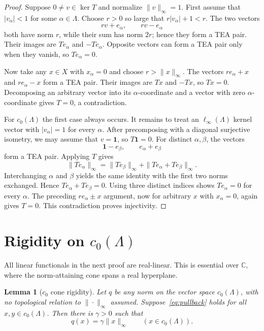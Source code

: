 \documentclass[11pt]{article}
\newtheorem{lemma}[theorem]{Lemma}
\begin{document}
\begin{proof}
Suppose $0\ne v\in\ker T$ and normalize $\|v\|_\infty=1$.  First assume
that $|v_\alpha|<1$ for some $\alpha\in\Lambda$.  Choose $r>0$ so large that
$r|v_\alpha|+1<r$.  The two vectors
\[
 rv+e_\alpha,\qquad rv-e_\alpha
\]
both have norm $r$, while their sum has norm $2r$; hence they form a TEA
pair.  Their images are $Te_\alpha$ and $-Te_\alpha$.  Opposite vectors can
form a TEA pair only when they vanish, so $Te_\alpha=0$.

Now take any $x\in X$ with $x_\alpha=0$ and choose $r>\|x\|_\infty$.
The vectors $re_\alpha+x$ and $re_\alpha-x$ form a TEA pair.  Their images
are $Tx$ and $-Tx$, so $Tx=0$.  Decomposing an arbitrary vector into its
$\alpha$-coordinate and a vector with zero $\alpha$-coordinate gives $T=0$,
a contradiction.

For $c_0(\Lambda)$ the first case always occurs.  It remains to treat an
$\ell_\infty(\Lambda)$ kernel vector with $|v_\alpha|=1$ for every $\alpha$.
After precomposing with a diagonal surjective isometry, we may assume that
$v=\mathbf 1$, so $T\mathbf 1=0$.  For distinct $\alpha,\beta$, the vectors
\[
 \mathbf 1-e_\beta,\qquad e_\alpha+e_\beta
\]
form a TEA pair.  Applying $T$ gives
\begin{equation}\label{eq:kernel1}
 \|Te_\alpha\|_\infty
 =\|Te_\beta\|_\infty+\|Te_\alpha+Te_\beta\|_\infty.
\end{equation}
Interchanging $\alpha$ and $\beta$ yields the same identity with the first
two norms exchanged.  Hence $Te_\alpha+Te_\beta=0$.  Using three distinct
indices shows $Te_\alpha=0$ for every $\alpha$.  The preceding
$re_\alpha\pm x$ argument, now for arbitrary $x$ with $x_\alpha=0$, again
gives $T=0$.  This contradiction proves injectivity.
\end{proof}

\section{Rigidity on \texorpdfstring{$c_0(\Lambda)$}{c0(Lambda)}}

All linear functionals in the next proof are real-linear.  This is essential
over $\mathbb C$, where the norm-attaining cone spans a real hyperplane.

\begin{lemma}[$c_0$ cone rigidity]\label{lem:c0}
Let $q$ be any norm on the vector space $c_0(\Lambda)$, with no topological
relation to $\|\cdot\|_\infty$ assumed.  Suppose~\eqref{eq:pullback} holds for
all $x,y\in c_0(\Lambda)$.  Then there is $\gamma>0$ such that
\[
 q(x)=\gamma\|x\|_\infty\qquad(x\in c_0(\Lambda)).
\]
\end{lemma}
\end{document}
